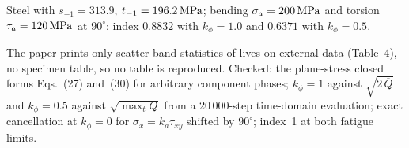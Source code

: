  Steel with $s_{-1}=313.9$, $t_{-1}=196.2\,\mathrm{MPa}$; bending $\sigma_a=200\,\mathrm{MPa}$ and torsion
$\tau_a=120\,\mathrm{MPa}$ at $90^\circ$: index $0.8832$ with $k_\phi=1.0$ and $0.6371$ with $k_\phi=0.5$.

 The paper prints only scatter-band statistics of lives on external data (Table~4),
no specimen table, so no table is reproduced. Checked: the plane-stress closed forms Eqs.~(27) and~(30)
for arbitrary component phases; $k_\phi=1$ against $\sqrt{2\,\overline Q}$ and $k_\phi=0.5$ against
$\sqrt{\max_t Q}$ from a 20\,000-step time-domain evaluation; exact cancellation at $k_\phi=0$ for
$\sigma_x=k_a\tau_{xy}$ shifted by $90^\circ$; index~1 at both fatigue limits.
